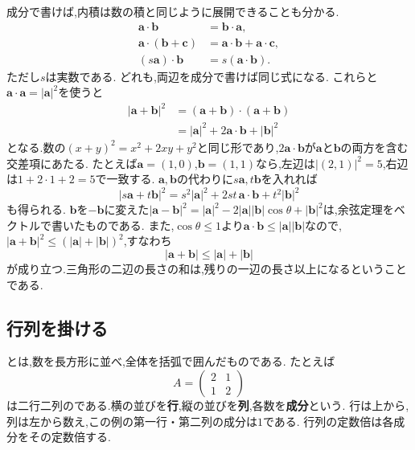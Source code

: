 成分で書けば,内積は数の積と同じように展開できることも分かる.
\[
  \begin{aligned}
    \boldsymbol a\cdot\boldsymbol b&=\boldsymbol b\cdot\boldsymbol a,\\
    \boldsymbol a\cdot(\boldsymbol b+\boldsymbol c)&=\boldsymbol a\cdot\boldsymbol b+\boldsymbol a\cdot\boldsymbol c,\\
    (s\boldsymbol a)\cdot\boldsymbol b&=s(\boldsymbol a\cdot\boldsymbol b).
  \end{aligned}
\]
ただし$s$は実数である.
どれも,両辺を成分で書けば同じ式になる.
これらと$\boldsymbol a\cdot\boldsymbol a=|\boldsymbol a|^2$を使うと
\[
  \begin{aligned}
    |\boldsymbol a+\boldsymbol b|^2
    &=(\boldsymbol a+\boldsymbol b)\cdot(\boldsymbol a+\boldsymbol b)\\
    &=|\boldsymbol a|^2+2\boldsymbol a\cdot\boldsymbol b+|\boldsymbol b|^2
  \end{aligned}
\]
となる.数の$(x+y)^2=x^2+2xy+y^2$と同じ形であり,$2\boldsymbol a\cdot\boldsymbol b$が$\boldsymbol a$と$\boldsymbol b$の両方を含む交差項にあたる.
たとえば$\boldsymbol a=(1,0)$,$\boldsymbol b=(1,1)$なら,左辺は$|(2,1)|^2=5$,右辺は$1+2\cdot1+2=5$で一致する.
$\boldsymbol a,\boldsymbol b$の代わりに$s\boldsymbol a,t\boldsymbol b$を入れれば
\[
  |s\boldsymbol a+t\boldsymbol b|^2
  =s^2|\boldsymbol a|^2+2st\,\boldsymbol a\cdot\boldsymbol b+t^2|\boldsymbol b|^2
\]
も得られる.
$\boldsymbol b$を$-\boldsymbol b$に変えた$|\boldsymbol a-\boldsymbol b|^2=|\boldsymbol a|^2-2|\boldsymbol a||\boldsymbol b|\cos\theta+|\boldsymbol b|^2$は,余弦定理をベクトルで書いたものである.
また,$\cos\theta\le1$より$\boldsymbol a\cdot\boldsymbol b\le|\boldsymbol a||\boldsymbol b|$なので,$|\boldsymbol a+\boldsymbol b|^2\le(|\boldsymbol a|+|\boldsymbol b|)^2$,すなわち
\[
  |\boldsymbol a+\boldsymbol b|\le|\boldsymbol a|+|\boldsymbol b|
\]
が成り立つ.三角形の二辺の長さの和は,残りの一辺の長さ以上になるということである.

\subsection{行列を掛ける}\label{節：行列を掛ける}
とは,数を長方形に並べ,全体を括弧で囲んだものである.
たとえば
\[
  A=\begin{pmatrix}2&1\\1&2\end{pmatrix}
\]
は二行二列のである.横の並びを\textbf{行},縦の並びを\textbf{列},各数を\textbf{成分}という.
行は上から,列は左から数え,この例の第一行・第二列の成分は$1$である.
行列の定数倍は各成分をその定数倍する.

